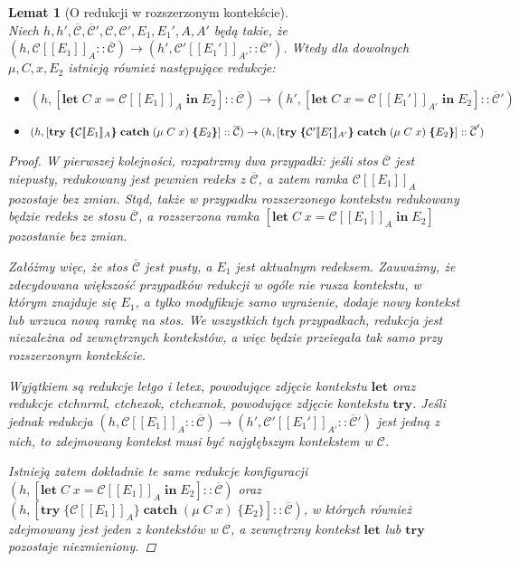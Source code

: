 \documentclass[]{pracamgr}
\renewcommand \| {\hspace{0.75em} | \hspace{0.75em} }
\renewcommand \[ {[\![}
\renewcommand \] {]\!]}
\newtheorem{lemma}{Lemat}
\theoremstyle{definition}
\newcommand{\mmod}{\mu\xspace}
\newcommand{\jlet}{\mathbf{let}\xspace}
\newcommand{\jin}{\mathbf{in}\xspace}
\newcommand{\jtry}{\mathbf{try}\xspace}
\newcommand{\jcatch}{\mathbf{catch}\xspace}
\newcommand{\letin}[4]{\jlet\; #1\; #2 = #3\; \jin\; #4\xspace}
\newcommand{\tcatch}[4]{\jtry\; \boldsymbol{\{}#1\boldsymbol{\}}\; \jcatch\; (#2\; #3)\; \boldsymbol{\{}#4\boldsymbol{\}}\xspace}
\newcommand{\ctxt}{\mathcal{C}\xspace}
\newcommand{\ctxts}{\overline{\ctxt}}
\begin{document}
\begin{lemma}[O redukcji w rozszerzonym kontekście]{\ } \\
\label{lem:red_ext_ctx}
Niech $h, h', \ctxts, \ctxts', \ctxt, \ctxt', E_1, E_1', A, A'$ będą takie, że
$(h, \ctxt \[ E_1 \]_A :: \ctxts) \rightarrow (h', \ctxt' \[ E_1' \]_{A'} :: \ctxts')$.
Wtedy dla dowolnych $\mmod, C, x, E_2$ istnieją również następujące redukcje:
\begin{itemize}
 \item $(h, [ \letin{C}{x}{\ctxt \[ E_1 \]_A}{E_2}] :: \ctxts) \rightarrow
        (h', [ \letin{C}{x}{\ctxt \[ E_1'\]_{A'}}{E_2}] :: \ctxts')$
 \item $(h, [ \tcatch{\ctxt \[ E_1 \]_A}{\mmod\; C}{x}{E_2}] :: \ctxts) \rightarrow \\
        (h, [ \tcatch{\ctxt' \[ E_1' \]_{A'}}{\mmod\; C}{x}{E_2}] :: \ctxts')$
\end{itemize}
\begin{proof}
W pierwszej kolejności, rozpatrzmy dwa przypadki: jeśli stos $\ctxts$ jest niepusty,
redukowany jest pewnien redeks z $\ctxts$, a zatem ramka $\ctxt\[E_1\]_A$ pozostaje bez zmian.
Stąd, także w przypadku rozszerzonego kontekstu redukowany będzie redeks ze stosu $\ctxts$, a
rozszerzona ramka $[ \letin{C}{x}{\ctxt \[ E_1 \]_A}{E_2}]$ pozostanie bez zmian.

Załóżmy więc, że stos $\ctxts$ jest pusty, a $E_1$ jest aktualnym redeksem.
Zauważmy, że zdecydowana większość przypadków redukcji w ogóle nie rusza kontekstu,
w którym znajduje się $E_1$, a tylko modyfikuje samo wyrażenie, dodaje nowy kontekst
lub wrzuca nową ramkę na stos. We wszystkich tych przypadkach, redukcja jest niezależna od
zewnętrznych kontekstów, a więc będzie przeiegała tak samo przy rozszerzonym kontekście.

Wyjątkiem są redukcje letgo i letex, powodujące zdjęcie kontekstu $\jlet$ oraz
redukcje ctchnrml, ctchexok, ctchexnok, powodujące zdjęcie kontekstu $\jtry$.
Jeśli jednak redukcja
$(h, \ctxt \[ E_1 \]_A :: \ctxts) \rightarrow (h', \ctxt' \[ E_1' \]_{A'} :: \ctxts')$
jest jedną z nich, to zdejmowany kontekst musi być najgłębszym kontekstem w $\ctxt$.

Istnieją zatem dokładnie te same redukcje konfiguracji
$(h, [ \letin{C}{x}{\ctxt \[ E_1 \]_A}{E_2}] :: \ctxts)$ oraz
$(h, [ \tcatch{\ctxt \[ E_1 \]_A}{\mmod\; C}{x}{E_2}] :: \ctxts)$,
w których również zdejmowany jest
jeden z kontekstów w $\ctxt$, a zewnętrzny kontekst $\jlet$ lub $\jtry$ pozostaje niezmieniony.
\end{proof}
\end{lemma}
\end{document}
